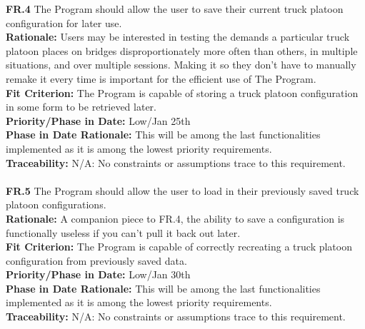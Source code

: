 \documentclass[12pt]{article}
\begin{document}
  \noindent\textbf{FR.4} The Program should allow the user to save their current truck platoon configuration for later use.\\
  \textbf{Rationale:} Users may be interested in testing the demands a particular truck platoon places on bridges disproportionately more often than others,
   in multiple situations, and over multiple sessions. Making it so they don't have to manually remake it every time is important for the efficient use of The Program.\\
  \textbf{Fit Criterion:} The Program is capable of storing a truck platoon configuration in some form to be retrieved later.\\
  \textbf{Priority/Phase in Date:} Low/Jan 25th\\
  \textbf{Phase in Date Rationale:} This will be among the last functionalities implemented as it is among the lowest priority requirements.\\
  \textbf{Traceability:} N/A: No constraints or assumptions trace to this requirement.\\\\

  \noindent\textbf{FR.5} The Program should allow the user to load in their previously saved truck platoon configurations.\\
  \textbf{Rationale:} A companion piece to FR.4, the ability to save a configuration is functionally useless if you can't pull it back out later.\\
  \textbf{Fit Criterion:} The Program is capable of correctly recreating a truck platoon configuration from previously saved data.\\
  \textbf{Priority/Phase in Date:} Low/Jan 30th\\
  \textbf{Phase in Date Rationale:} This will be among the last functionalities implemented as it is among the lowest priority requirements.\\
  \textbf{Traceability:} N/A: No constraints or assumptions trace to this requirement.\\\\
\end{document}
